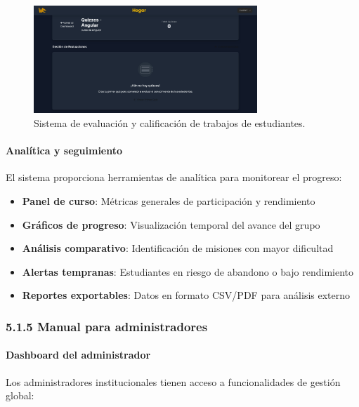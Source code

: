 \begin{figure}[H]
	\centering
	\includegraphics[width=0.75\textwidth]{images/pagina_web_gestion-de-evaluaciones.jpg}
	\caption{Sistema de evaluación y calificación de trabajos de estudiantes.}
	\label{fig:manual-evaluaciones}
\end{figure}

\paragraph{Analítica y seguimiento}

El sistema proporciona herramientas de analítica para monitorear el progreso:

\begin{itemize}
	\item \textbf{Panel de curso}: Métricas generales de participación y rendimiento
	\item \textbf{Gráficos de progreso}: Visualización temporal del avance del grupo
	\item \textbf{Análisis comparativo}: Identificación de misiones con mayor dificultad
	\item \textbf{Alertas tempranas}: Estudiantes en riesgo de abandono o bajo rendimiento
	\item \textbf{Reportes exportables}: Datos en formato CSV/PDF para análisis externo
\end{itemize}

\subsubsection{5.1.5 Manual para administradores}

\paragraph{Dashboard del administrador}

Los administradores institucionales tienen acceso a funcionalidades de gestión global:

